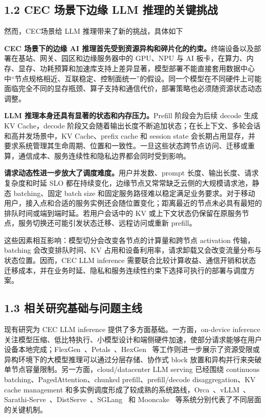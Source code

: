 \subsection*{1.2 CEC 场景下边缘 LLM 推理的关键挑战}
然而，CEC场景给 LLM 推理带来了新的挑战，具体如下

\textbf{CEC 场景下的边缘 AI 推理首先受到资源异构和碎片化的约束。}终端设备以及部署在基站、网关、园区和边缘服务器中的 GPU、NPU 与 AI 板卡，在算力、内存、显存、功耗预算和加速库支持上差异显著，模型部署不能直接套用数据中心中“节点规格相近、互联稳定、控制面统一”的假设。同一个模型在不同硬件上可能面临完全不同的显存瓶颈、算子支持和通信代价，部署策略也必须随资源状态动态调整。

\textbf{LLM 推理本身还具有显著的状态和内存压力。}Prefill 阶段会为后续 decode 生成 KV Cache，decode 阶段又会随着输出长度不断追加状态；在长上下文、多轮会话和高并发场景中，KV Cache、prefix cache 和 session state 会长期占用显存，并要求系统管理其生命周期、位置和一致性。一旦这些状态跨节点访问、迁移或重算，通信成本、服务连续性和隐私边界都会同时受到影响。

\textbf{请求动态性进一步放大了调度难度。}用户并发数、prompt 长度、输出长度、请求复杂度和时延 SLO 都在持续变化，边缘节点又常常缺乏云侧的大规模请求池，静态 batching、固定 batch size 和固定服务路径难以稳定满足业务要求。对于移动用户，接入点和合适的服务实例还会随位置变化；距离最近的节点未必具有最短的排队时间或端到端时延。若用户会话中的 KV 或上下文状态仍保留在原服务节点，服务切换还可能引发状态迁移、远程访问或重新 prefill。

这些因素相互影响：模型切分会改变各节点的计算量和跨节点 activation 传输，batching 会改变排队时间、KV 占用和设备利用率，请求卸载又会改变流量分布与状态位置。因而，CEC LLM inference 需要联合比较计算收益、通信开销和状态迁移成本，并在业务时延、隐私和服务连续性约束下选择可执行的部署与调度方案。


\subsection*{1.3 相关研究基础与问题主线}

现有研究为 CEC LLM inference 提供了多方面基础。一方面，on-device inference 关注模型压缩、低比特执行、小模型设计和端侧硬件加速，使部分请求能够在用户设备本地完成；FlexGen~\cite{sheng2023flexgen}、Petals~\cite{borzunov2023petals}、HexGen~\cite{jiang2023hexgen} 等工作则进一步展示了资源受限或异构环境下的大模型推理可以通过分层存储、协作式 block 放置和异构并行来突破单节点容量限制。另一方面，cloud/datacenter LLM serving 已经围绕 continuous batching、PagedAttention、chunked prefill、prefill/decode disaggregation、KV cache management 和多实例调度形成了较成熟的系统路线，Orca~\cite{yu2022orca}、vLLM~\cite{kwon2023efficient}、Sarathi-Serve~\cite{agrawal2024taming}、DistServe~\cite{zhong2024distserve}、SGLang~\cite{zheng2024sglang} 和 Mooncake~\cite{qin2025mooncake} 等系统分别代表了不同层面的关键机制。

